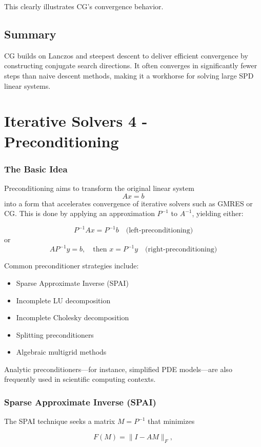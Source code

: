 \documentclass[11pt,a4paper]{book}
\begin{document}
This clearly illustrates CG’s convergence behavior.

\section*{Summary}
CG builds on Lanczos and steepest descent to deliver efficient convergence by constructing conjugate search directions. It often converges in significantly fewer steps than naive descent methods, making it a workhorse for solving large SPD linear systems.


\chapter{Iterative Solvers 4 - Preconditioning}

\subsection*{The Basic Idea}
Preconditioning aims to transform the original linear system
\[
Ax = b
\]
into a form that accelerates convergence of iterative solvers such as GMRES or CG. This is done by applying an approximation \(P^{-1}\) to \(A^{-1}\), yielding either:

\[
P^{-1} A x = P^{-1} b
\quad\text{(left-preconditioning)}
\]
or
\[
A P^{-1} y = b,\quad \text{then } x = P^{-1} y
\quad\text{(right-preconditioning)}
\]

Common preconditioner strategies include:
\begin{itemize}
  \item Sparse Approximate Inverse (SPAI)
  \item Incomplete LU decomposition
  \item Incomplete Cholesky decomposition
  \item Splitting preconditioners
  \item Algebraic multigrid methods
\end{itemize}

Analytic preconditioners—for instance, simplified PDE models—are also frequently used in scientific computing contexts.

\subsection*{Sparse Approximate Inverse (SPAI)}
The SPAI technique seeks a matrix \(M = P^{-1}\) that minimizes

\[
F(M) = \|I - A M\|_F,
\]
\end{document}
